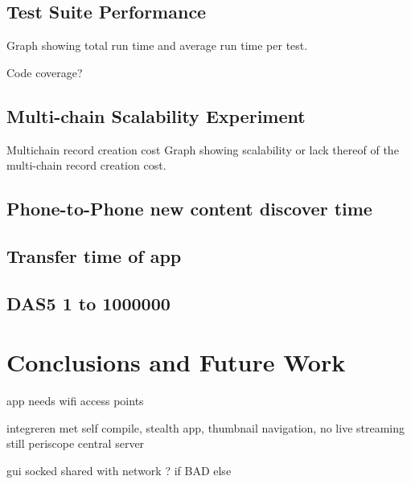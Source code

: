 \documentclass[]{report}
\begin{document}
\section{Test Suite Performance}
Graph showing total run time and average run time per test.

Code coverage?

\section{Multi-chain Scalability Experiment}
Multichain record creation cost
Graph showing scalability or lack thereof of the multi-chain record creation cost.


\section{Phone-to-Phone new content discover time}



\section{Transfer time of app}



\section{DAS5 1 to 1000000} 



\chapter{Conclusions and Future Work}
app needs wifi access points


integreren met self compile, stealth app, thumbnail navigation, no live streaming still
periscope central server

gui socked shared with network ? if BAD else
\end{document}
